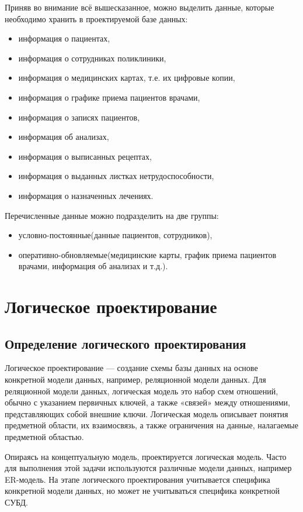 \documentclass[14pt,a4paper,russian]{extreport}
\begin{document}
Приняв во внимание всё вышесказанное, можно выделить данные, которые необходимо хранить в проектируемой базе данных:
\begin{itemize}[noitemsep]
\renewcommand\labelitemi{--}
    \item информация о пациентах,
    \item информация о сотрудниках поликлиники,
    \item информация о медицинских картах, т.е. их цифровые копии,
    \item информация о графике приема пациентов врачами,
    \item информация о записях пациентов,
    \item информация об анализах,
    \item информация о выписанных рецептах,
    \item информация о выданных листках нетрудоспособности,
    \item информация о назначенных лечениях.
\end{itemize}

Перечисленные данные можно подразделить на две группы:
\begin{itemize}[noitemsep]
    \item условно-постоянные(данные пациентов, сотрудников),
    \item оперативно-обновляемые(медицинские карты, график приема пациентов врачами, информация об
        анализах и т.д.).
\end{itemize}


\chapter{Логическое проектирование}
\section{Определение логического проектирования}
Логическое проектирование — создание схемы базы данных на основе конкретной модели
данных, например, реляционной модели данных. Для реляционной модели данных, логическая модель это
набор схем отношений, обычно с указанием первичных ключей, а также «связей»
между отношениями, представляющих собой внешние ключи. Логическая модель
описывает понятия предметной области, их взаимосвязь, а также ограничения на
данные, налагаемые предметной областью.

Опираясь на концептуальную модель, проектируется логическая модель. Часто для выполнения этой
задачи используются различные модели данных, например ER-модель.
На этапе логического проектирования учитывается специфика конкретной модели данных, но может
не учитываться специфика конкретной СУБД. 
\end{document}
